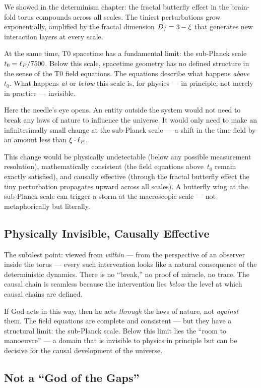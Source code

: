 We showed in the determinism chapter: the fractal butterfly effect in the brain-fold torus compounds across all scales. The tiniest perturbations grow exponentially, amplified by the fractal dimension $D_f = 3 - \xi$ that generates new interaction layers at every scale.

At the same time, T0 spacetime has a fundamental limit: the sub-Planck scale $t_0 = \ell_P / 7500$. Below this scale, spacetime geometry has no defined structure in the sense of the T0 field equations. The equations describe what happens \emph{above}~$t_0$. What happens \emph{at} or \emph{below} this scale is, for physics --- in principle, not merely in practice --- invisible.

Here the needle's eye opens. An entity outside the system would not need to break any laws of nature to influence the universe. It would only need to make an infinitesimally small change at the sub-Planck scale --- a shift in the time field by an amount less than $\xi \cdot \ell_P$.

This change would be physically undetectable (below any possible measurement resolution), mathematically consistent (the field equations above~$t_0$ remain exactly satisfied), and causally effective (through the fractal butterfly effect the tiny perturbation propagates upward across all scales). A butterfly wing at the sub-Planck scale can trigger a storm at the macroscopic scale --- not metaphorically but literally.

\subsection{Physically Invisible, Causally Effective}

The subtlest point: viewed from \emph{within} --- from the perspective of an observer inside the torus --- every such intervention looks like a natural consequence of the deterministic dynamics. There is no ``break,'' no proof of miracle, no trace. The causal chain is seamless because the intervention lies \emph{below} the level at which causal chains are defined.

If God acts in this way, then he acts \emph{through} the laws of nature, not \emph{against} them. The field equations are complete and consistent --- but they have a structural limit: the sub-Planck scale. Below this limit lies the ``room to manoeuvre'' --- a domain that is invisible to physics in principle but can be decisive for the causal development of the universe.

\subsection{Not a ``God of the Gaps''}

